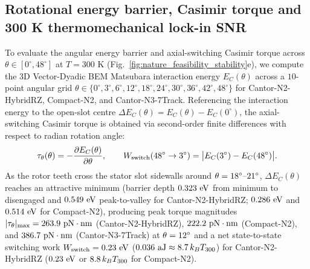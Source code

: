 \documentclass[pdflatex,sn-nature]{sn-jnl}
\DeclareRobustCommand{\roundone}[1]{\fpeval{round(#1,1)}}
\DeclareRobustCommand{\roundtwo}[1]{\fpeval{round(#1,2)}}
\DeclareRobustCommand{\roundthree}[1]{\fpeval{round(#1,3)}}
\begin{document}
\subsection*{Rotational energy barrier, Casimir torque and 300 K thermomechanical lock-in SNR}
To evaluate the angular energy barrier and axial-switching Casimir torque across $\theta \in [0^\circ, 48^\circ]$ at $T = 300\text{ K}$ (Fig.~\ref{fig:nature_feasibility_stability}e), we compute the 3D Vector-Dyadic BEM Matsubara interaction energy $E_C(\theta)$ across a $10$-point angular grid $\theta \in \{0^\circ, 3^\circ, 6^\circ, 12^\circ, 18^\circ, 24^\circ, 30^\circ, 36^\circ, 42^\circ, 48^\circ\}$ for Cantor-N2-HybridRZ, Compact-N2, and Cantor-N3-7Track. Referencing the interaction energy to the open-slot centre $\Delta E_C(\theta) = E_C(\theta) - E_C(0^\circ)$, the axial-switching Casimir torque is obtained via second-order finite differences with respect to radian rotation angle:
\begin{equation}
\tau_\theta(\theta) = -\frac{\partial E_C(\theta)}{\partial \theta}, \qquad
W_{\rm switch}(48^\circ \to 3^\circ) = \bigl|E_C(3^\circ) - E_C(48^\circ)\bigr|.
\label{eq:methods_rotational_torque}
\end{equation}
As the rotor teeth cross the stator slot sidewalls around $\theta = 18{}^\circ\text{--}21^\circ$, $\Delta E_C(\theta)$ reaches an attractive minimum (barrier depth $\roundthree{\NatureCantorNtwoHybridrzRotationalEnergyBarrierSwitchingBarrierFromMinToDisengagedEv}\text{ eV}$ from minimum to disengaged and $\roundthree{\NatureCantorNtwoHybridrzRotationalEnergyBarrierSwitchingBarrierPeakToValleyEv}\text{ eV}$ peak-to-valley for Cantor-N2-HybridRZ; $\roundthree{\NatureRotCeightCompactNtwoRotationalEnergyBarrierSwitchingBarrierFromMinToDisengagedEv}\text{ eV}$ and $\roundthree{\NatureRotCeightCompactNtwoRotationalEnergyBarrierSwitchingBarrierPeakToValleyEv}\text{ eV}$ for Compact-N2), producing peak torque magnitudes $|\tau_\theta|_{\max} = \roundone{\NatureCantorNtwoHybridrzPeakTorquePnNm}\text{ pN}\cdot\text{nm}$ (Cantor-N2-HybridRZ), $\roundone{\NatureRotCeightCompactNtwoPeakTorquePnNm}\text{ pN}\cdot\text{nm}$ (Compact-N2), and $\roundone{\NatureFractalNthreeCantorseventrackPeakTorquePnNm}\text{ pN}\cdot\text{nm}$ (Cantor-N3-7Track) at $\theta = 12{}^\circ$ and a net state-to-state switching work $W_{\rm switch} = \roundtwo{\NatureCantorNtwoHybridrzRotationalEnergyBarrierSwitchingWorkEv}\text{ eV}$ ($\roundthree{\NatureCantorNtwoHybridrzRotationalEnergyBarrierSwitchingWorkAj}\text{ aJ} \approx \roundone{\NatureCantorNtwoHybridrzRotationalEnergyBarrierSwitchingWorkOverKbtthreezerozero}\,k_B T_{300}$) for Cantor-N2-HybridRZ ($\roundtwo{\NatureRotCeightCompactNtwoRotationalEnergyBarrierSwitchingWorkEv}\text{ eV}$ or $\roundone{\NatureRotCeightCompactNtwoRotationalEnergyBarrierSwitchingWorkOverKbtthreezerozero}\,k_B T_{300}$ for Compact-N2).
\end{document}
